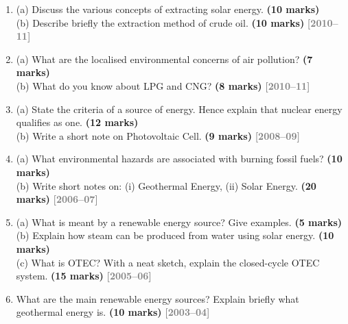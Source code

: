 \documentclass[12pt,a3paper]{article}
\newcommand{\yr}[1]{\hfill\textcolor{gray}{\small\textbf{[#1]}}}
\newcommand{\mk}[1]{\textcolor{orange!70!black}{\small\textbf{(#1 marks)}}}
\begin{document}
\begin{enumerate}
\item \label{qlabel:A1-Q10}
(a) Discuss the various concepts of extracting solar energy. \mk{10}\\
(b) Describe briefly the extraction method of crude oil. \mk{10}
\yr{2010--11}




\item \label{qlabel:A1-Q11}
(a) What are the localised environmental concerns of air pollution? \mk{7}\\
(b) What do you know about LPG and CNG? \mk{8}
\yr{2010--11}




\item \label{qlabel:A1-Q15}
(a) State the criteria of a source of energy. Hence explain that nuclear energy qualifies as one. \mk{12}\\
(b) Write a short note on Photovoltaic Cell. \mk{9}
\yr{2008--09}




\item \label{qlabel:A1-Q16}
(a) What environmental hazards are associated with burning fossil fuels? \mk{10}\\
(b) Write short notes on: (i) Geothermal Energy, (ii) Solar Energy. \mk{20}
\yr{2006--07}




\item \label{qlabel:A1-Q17}
(a) What is meant by a renewable energy source? Give examples. \mk{5}\\
(b) Explain how steam can be produced from water using solar energy. \mk{10}\\
(c) What is OTEC? With a neat sketch, explain the closed-cycle OTEC system. \mk{15}
\yr{2005--06}




\item \label{qlabel:A1-Q18}
What are the main renewable energy sources? Explain briefly what geothermal energy is. \mk{10}
\yr{2003--04}






\end{enumerate}
\end{document}
